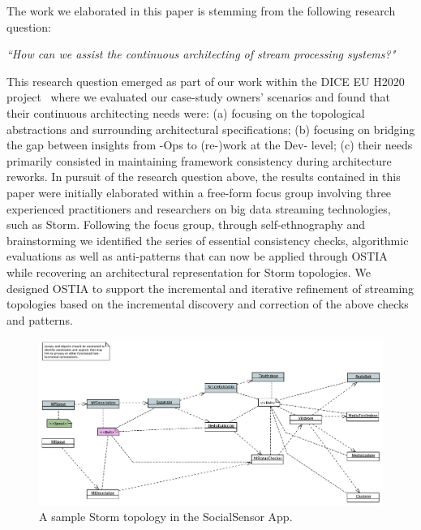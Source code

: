 
The work we elaborated in this paper is stemming from the following research question:

\begin{center}
\emph{``How can we assist the continuous architecting of stream processing systems?"}
\end{center}

This research question emerged as part of our work within the DICE EU H2020 project~\cite{dice2020}
where we evaluated our case-study owners' scenarios and found that their continuous architecting needs were: (a) focusing on the topological abstractions and surrounding architectural specifications; (b) focusing on bridging the gap between insights from -Ops to (re-)work at the Dev- level; (c) their needs primarily consisted in maintaining framework consistency during architecture reworks.
In pursuit of the research question above, the results contained in this paper were initially elaborated within a free-form focus group \cite{focusgroup} involving three experienced practitioners and researchers on big data streaming technologies, such as Storm. Following the focus group, through self-ethnography \cite{selfeth} and brainstorming we identified the series of essential consistency checks, algorithmic evaluations as well as anti-patterns that can now be applied through OSTIA while recovering an architectural representation for Storm topologies. We designed OSTIA
to support the incremental and iterative refinement of streaming topologies based on the incremental discovery and correction of the above checks and patterns.

\begin{figure}
  \centering
  \includegraphics[width=12cm]{images/socialsensor}
  \caption{A sample Storm topology in the SocialSensor App.}
  \label{socialsensor-topology}
\end{figure}

